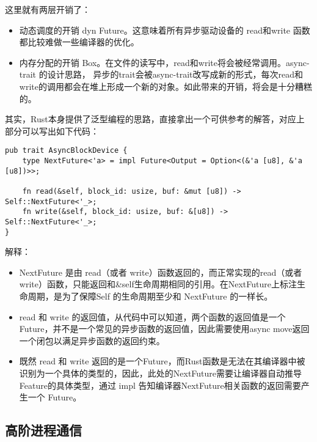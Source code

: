 这里就有两层开销了：

\begin{itemize}
    \item 动态调度的开销 dyn Future。这意味着所有异步驱动设备的 read和write 函数都比较难做一些编译器的优化。
    \item 内存分配的开销 Box。在文件的读写中，read和write将会被经常调用。async-trait 的设计思路， 异步的trait会被async-trait改写成新的形式，每次read和write的调用都会在堆上形成一个新的对象。如此带来的开销，将会是十分糟糕的。
\end{itemize}
其实，Rust本身提供了泛型编程的思路，直接拿出一个可供参考的解答，对应上部分可以写出如下代码：


\begin{lstlisting}[caption = AsyncBlockDevice的泛型异步接口]
pub trait AsyncBlockDevice {
    type NextFuture<'a> = impl Future<Output = Option<(&'a [u8], &'a [u8])>>;

    fn read(&self, block_id: usize, buf: &mut [u8]) -> Self::NextFuture<'_>;
    fn write(&self, block_id: usize, buf: &[u8]) -> Self::NextFuture<'_>;
}
\end{lstlisting}


解释：

\begin{itemize}
    \item NextFuture 是由 read（或者 write）函数返回的，而正常实现的read（或者 write）函数，只能返回和\&self生命周期相同的引用。在NextFuture上标注生命周期，是为了保障Self 的生命周期至少和 NextFuture 的一样长。
    \item read 和 write 的返回值，从代码中可以知道，两个函数的返回值是一个 Future，并不是一个常见的异步函数的返回值，因此需要使用async move返回一个闭包以满足异步函数的返回约束。
    \item 既然 read 和 write 返回的是一个Future，而Rust函数是无法在其编译器中被识别为一个具体的类型的，因此，此处的NextFuture需要让编译器自动推导Feature的具体类型，通过 impl 告知编译器NextFuture相关函数的返回需要产生一个	Future。
\end{itemize}

\subsection{高阶进程通信}

